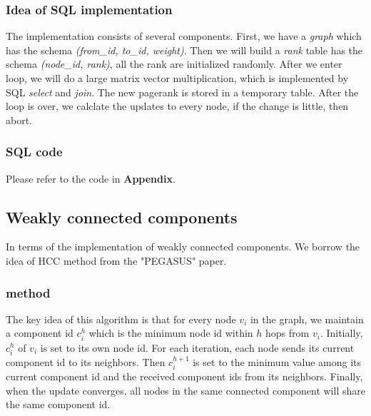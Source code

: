 \subsubsection{Idea of SQL implementation}
The implementation consists of several components.
First, we have a \emph{graph} which has the schema \emph{(from\_id, to\_id, weight)}. Then we will build a \emph{rank} table has the schema \emph{(node\_id, rank)}, all the rank are initialized randomly. After we enter loop, we will do a large matrix vector multiplication, which is implemented by SQL \emph{select} and \emph{join}. The new pagerank is stored in a temporary table. After the loop is over, we calclate the updates to every node, if the change is little, then abort.

\subsubsection{SQL code}
Please refer to the code in {\bf Appendix}.

\subsection{Weakly connected components}
In terms of the implementation of weakly connected components. We borrow the idea of HCC method from the "PEGASUS" paper.\cite{Kang09}

\subsubsection{method}
The key idea of this algorithm is that for every node $v_i$ in the graph, we maintain a component id $c_i^h$ which is the minimum node id within $h$ hops from $v_i$. Initially, $c_i^h$
of $v_i$ is set to its own node id. For each iteration, each node sends its current component id to its neighbors. Then $c_i^{h+1}$ is set to the minimum value among its current component id and the received component ids from its neighbors. Finally, when the update converges, all nodes in the same connected component will share the same component id. 

